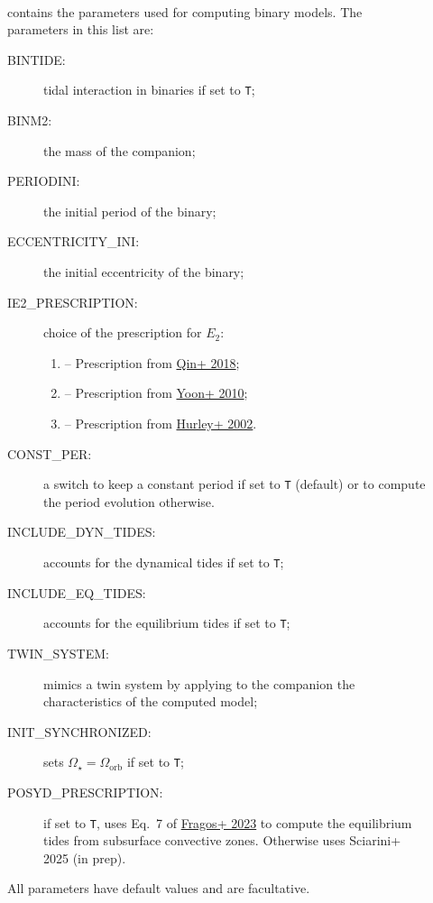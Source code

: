 \documentclass[11pt]{article}
\begin{document}
\begin{description}
    \item[] ~\\ contains the parameters used for computing binary models. The parameters in this list are:
    \begin{description}
      \item[BINTIDE:] tidal interaction in binaries if set to \texttt{T};
      \item[BINM2:] the mass of the companion;
      \item[PERIODINI:] the initial period of the binary;
      \item[ECCENTRICITY\_INI:] the initial eccentricity of the binary;
      \item[IE2\_PRESCRIPTION:] choice of the prescription for $E_2$:
        \begin{enumerate}
          \item[0] -- Prescription from \href{https://ui.adsabs.harvard.edu/abs/2018A&A...616A..28Q}{Qin+ 2018};
          \item[1] -- Prescription from \href{https://ui.adsabs.harvard.edu/abs/2010ApJ...725..940Y}{Yoon+ 2010};
          \item[2] -- Prescription from \href{https://ui.adsabs.harvard.edu/abs/2002MNRAS.329..897H}{Hurley+ 2002}.
        \end{enumerate}
      \item[CONST\_PER:] a switch to keep a constant period if set to \texttt{T} (default) or to compute the period evolution otherwise.
      \item[INCLUDE\_DYN\_TIDES:] accounts for the dynamical tides if set to \texttt{T};
      \item[INCLUDE\_EQ\_TIDES:] accounts for the equilibrium tides if set to \texttt{T};
      \item[TWIN\_SYSTEM:] mimics a twin system by applying to the companion the characteristics of the computed model;
      \item[INIT\_SYNCHRONIZED:] sets $\Omega_\star=\Omega_\text{orb}$ if set to \texttt{T};
      \item[POSYD\_PRESCRIPTION:] if set to \texttt{T}, uses Eq.~7 of \href{https://ui.adsabs.harvard.edu/abs/2023ApJS..264...45F}{Fragos+ 2023} to compute the equilibrium tides from subsurface convective zones. Otherwise uses Sciarini+ 2025 (in prep).
    \end{description}
    All parameters have default values and are facultative. 


\end{description}
\end{document}
